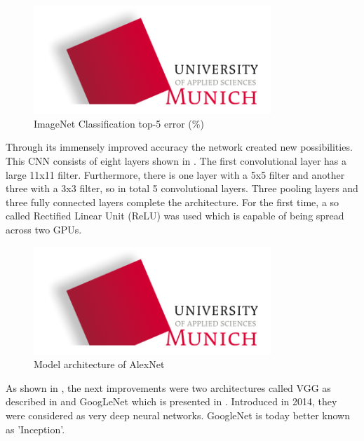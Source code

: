 \begin{figure}[htbp]
\includegraphics[width=0.8\textwidth]{includes/MUASlogo}
\caption[ImageNet Classification top-5 error]{ImageNet Classification top-5 error (\%) \citep{He2016}}
\label{fig:FH-Logo1}
\end{figure}

Through its immensely improved accuracy the network created new possibilities. This CNN consists of eight layers shown in . The first convolutional layer has a large 11x11 filter. Furthermore, there is one layer with a 5x5 filter and another three with a 3x3 filter, so in total 5 convolutional layers. Three pooling layers and three fully connected layers complete the architecture. For the first time, a so called Rectified Linear Unit (ReLU) was used which is capable of being spread across two GPUs. \\

\begin{figure}[htbp]
\includegraphics[width=0.8\textwidth]{includes/MUASlogo}
\caption[Model architecture of AlexNet]{Model architecture of AlexNet \citep{He2016}}
\label{fig:FH-Logo2}
\end{figure}

As shown in , the next improvements were two architectures called VGG as described in \citet{Simonyan2015} and GoogLeNet which is presented in \citet{Szegedy2014}. Introduced in 2014, they were considered as very deep neural networks. GoogleNet is today better known as 'Inception'. \\

